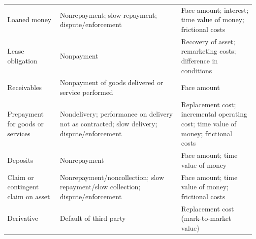 
\begin{center}
\footnotesize
\begin{tabular}{L{3.6cm} L{5.4cm} L{5.6cm}}
\toprule
{} &  &  \\
\midrule
Loaned money & Nonrepayment; slow repayment; dispute/enforcement &
  Face amount; interest; time value of money; frictional costs \\
Lease obligation & Nonpayment &
  Recovery of asset; remarketing costs; difference in conditions \\
Receivables & Nonpayment of goods delivered or service performed &
  Face amount \\
Prepayment for goods or services & Nondelivery; performance on delivery not as
  contracted; slow delivery; dispute/enforcement &
  Replacement cost; incremental operating cost; time value of money; frictional costs \\
Deposits & Nonrepayment & Face amount; time value of money \\
Claim or contingent claim on asset & Nonrepayment/noncollection; slow
  repayment/slow collection; dispute/enforcement &
  Face amount; time value of money; frictional costs \\
Derivative & Default of third party & Replacement cost (mark-to-market value) \\
\bottomrule
\end{tabular}
\end{center}


